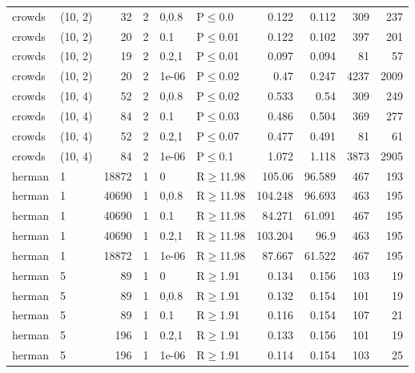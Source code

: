 \begin{longtable}{llrrllrrrr}
 crowds        & (10, 2)  &     	32 &   2 & 0,0.8 & P$\leq$0.0   & 0.122   & 0.112   & 309     & 237    \\
 crowds        & (10, 2)  &     	20 &   2 & 0.1   & P$\leq$0.01  & 0.122   & 0.102   & 397     & 201    \\
 crowds        & (10, 2)  &     	19 &   2 & 0.2,1 & P$\leq$0.01  & 0.097   & 0.094   & 81      & 57     \\
 crowds        & (10, 2)  &     	20 &   2 & 1e-06 & P$\leq$0.02  & 0.47    & 0.247   & 4237    & 2009   \\
 crowds        & (10, 4)  &     	52 &   2 & 0,0.8 & P$\leq$0.02  & 0.533   & 0.54    & 309     & 249    \\
 crowds        & (10, 4)  &     	84 &   2 & 0.1   & P$\leq$0.03  & 0.486   & 0.504   & 369     & 277    \\
 crowds        & (10, 4)  &     	52 &   2 & 0.2,1 & P$\leq$0.07  & 0.477   & 0.491   & 81      & 61     \\
 crowds        & (10, 4)  &     	84 &   2 & 1e-06 & P$\leq$0.1   & 1.072   & 1.118   & 3873    & 2905   \\
 herman        & 1        &  	18872 &   1 & 0     & R$\geq$11.98 & 105.06  & 96.589  & 467     & 193    \\
 herman        & 1        &  	40690 &   1 & 0,0.8 & R$\geq$11.98 & 104.248 & 96.693  & 463     & 195    \\
 herman        & 1        &  	40690 &   1 & 0.1   & R$\geq$11.98 & 84.271  & 61.091  & 467     & 195    \\
 herman        & 1        &  	40690 &   1 & 0.2,1 & R$\geq$11.98 & 103.204 & 96.9    & 463     & 195    \\
 herman        & 1        &  	18872 &   1 & 1e-06 & R$\geq$11.98 & 87.667  & 61.522  & 467     & 195    \\
 herman        & 5        &     	89 &   1 & 0     & R$\geq$1.91  & 0.134   & 0.156   & 103     & 19     \\
 herman        & 5        &     	89 &   1 & 0,0.8 & R$\geq$1.91  & 0.132   & 0.154   & 101     & 19     \\
 herman        & 5        &     	89 &   1 & 0.1   & R$\geq$1.91  & 0.116   & 0.154   & 107     & 21     \\
 herman        & 5        &    	196 &   1 & 0.2,1 & R$\geq$1.91  & 0.133   & 0.156   & 101     & 19     \\
 herman        & 5        &    	196 &   1 & 1e-06 & R$\geq$1.91  & 0.114   & 0.154   & 103     & 25     \\

\end{longtable}

